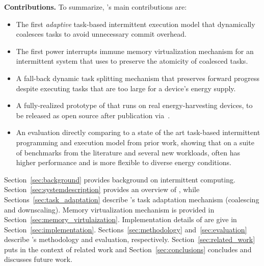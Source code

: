 %
%
%
\textbf{Contributions.} To summarize, \sys's main contributions are: 
%
\begin{itemize}
\item The first {\em adaptive} task-based intermittent execution model that dynamically coalesces tasks to avoid unnecessary commit overhead. 
\item The first power interrupts immune memory virtualization mechanism for an intermittent system that \sys uses to preserve the atomicity of coalesced tasks.
\item A fall-back dynamic task splitting mechanism that preserves forward progress despite executing tasks that are too large for a device's energy supply.
\item A fully-realized prototype of \sys that runs on real energy-harvesting devices, to be released as open source after publication via~\cite{coala_website}. 
\item An evaluation directly comparing \sys to a state of the art task-based intermittent programming and execution model from prior work, showing that on a suite of benchmarks from the literature and several new workloads, \sys often has higher performance and is more flexible to diverse energy conditions. 
\end{itemize}
%
Section~\ref{sec:background} provides background on intermittent computing.
Section~\ref{sec:systemdescription} provides an overview of \sys, while
Sections~\ref{sec:task_adaptation} describe \sys's task adaptation mechanism (coalescing and downscaling). Memory virtualization mechanism is provided in Section~\ref{sec:memory_virtulaization}. Implementation details of \sys are give in Section~\ref{sec:implementation}. Sections~\ref{sec:methodology} and~\ref{sec:evaluation} describe \sys's methodology and evaluation, respectively. Section~\ref{sec:related_work} puts \sys in the
context of related work and Section~\ref{sec:conclusions} concludes and discusses
future work.